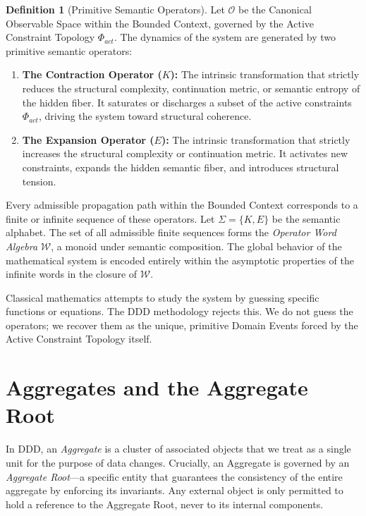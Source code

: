 \documentclass[12pt,openany]{extbook}
\theoremstyle{plain}
\theoremstyle{definition}
\newtheorem{definition}{Definition}[chapter]
\begin{document}
\begin{definition}[Primitive Semantic Operators]
Let $\mathcal{O}$ be the Canonical Observable Space within the Bounded Context, governed by the Active Constraint Topology $\Phi_{act}$. The dynamics of the system are generated by two primitive semantic operators:
\begin{enumerate}
    \item \textbf{The Contraction Operator ($K$):} The intrinsic transformation that strictly reduces the structural complexity, continuation metric, or semantic entropy of the hidden fiber. It saturates or discharges a subset of the active constraints $\Phi_{act}$, driving the system toward structural coherence.
    \item \textbf{The Expansion Operator ($E$):} The intrinsic transformation that strictly increases the structural complexity or continuation metric. It activates new constraints, expands the hidden semantic fiber, and introduces structural tension.
\end{enumerate}
\end{definition}

Every admissible propagation path within the Bounded Context corresponds to a finite or infinite sequence of these operators. Let $\Sigma = \{K, E\}$ be the semantic alphabet. The set of all admissible finite sequences forms the \emph{Operator Word Algebra} $\mathcal{W}$, a monoid under semantic composition. The global behavior of the mathematical system is encoded entirely within the asymptotic properties of the infinite words in the closure of $\mathcal{W}$.

Classical mathematics attempts to study the system by guessing specific functions or equations. The DDD methodology rejects this. We do not guess the operators; we recover them as the unique, primitive Domain Events forced by the Active Constraint Topology itself.

\section{Aggregates and the Aggregate Root}

In DDD, an \emph{Aggregate} is a cluster of associated objects that we treat as a single unit for the purpose of data changes. Crucially, an Aggregate is governed by an \emph{Aggregate Root}---a specific entity that guarantees the consistency of the entire aggregate by enforcing its invariants. Any external object is only permitted to hold a reference to the Aggregate Root, never to its internal components.
\end{document}
